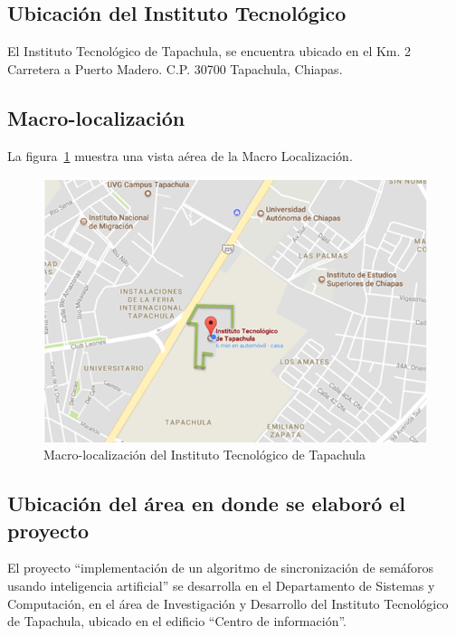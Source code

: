 \newpage

\subsection*{Ubicación del Instituto Tecnológico}
El Instituto Tecnológico de Tapachula, se encuentra ubicado en el Km. 2 Carretera a Puerto Madero. C.P. 30700 Tapachula, Chiapas.

%
\subsection*{Macro-localización}

La figura~\ref{fig:macroloc} muestra una vista aérea de la Macro Localización.

\begin{figure}[H]
\centering
\includegraphics[scale=0.8]{sources/macrolocalizacion.png}
\caption{Macro-localización del Instituto Tecnológico de Tapachula}\label{fig:macroloc}
\end{figure}

\pagebreak
\subsection*{Ubicación del área en donde se elaboró el proyecto}

El proyecto “implementación de un algoritmo de sincronización de semáforos usando inteligencia artificial” se desarrolla en el Departamento de Sistemas y Computación, en el área de Investigación y Desarrollo del Instituto Tecnológico de Tapachula, ubicado en el edificio “Centro de información”.

